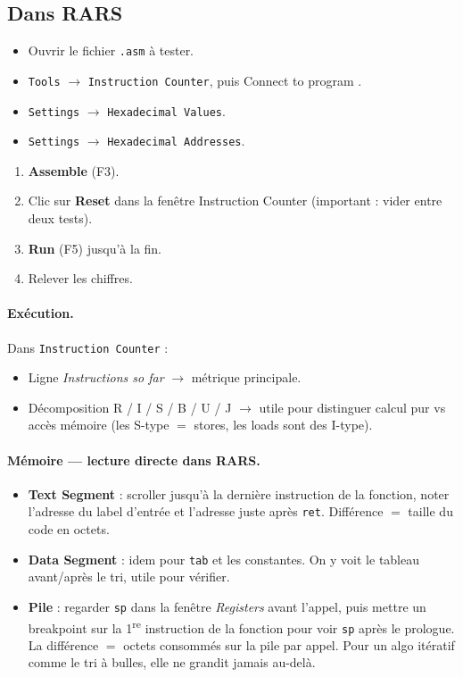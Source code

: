 \documentclass[11pt,a4paper]{article}
\begin{document}
\subsection{Dans RARS}

\begin{itemize}
    \item Ouvrir le fichier \texttt{.asm} à tester.
    \item \texttt{Tools} $\rightarrow$ \texttt{Instruction Counter}, puis \guillemotleft{} Connect to program \guillemotright{}.
    \item \texttt{Settings} $\rightarrow$ \texttt{Hexadecimal Values}.
    \item \texttt{Settings} $\rightarrow$ \texttt{Hexadecimal Addresses}.
\end{itemize}

\begin{enumerate}
    \item \textbf{Assemble} (F3).
    \item Clic sur \textbf{Reset} dans la fenêtre Instruction Counter (important : vider entre deux tests).
    \item \textbf{Run} (F5) jusqu'à la fin.
    \item Relever les chiffres.
\end{enumerate}

\paragraph{Exécution.} Dans \texttt{Instruction Counter} :
\begin{itemize}
    \item Ligne \emph{Instructions so far} $\rightarrow$ métrique principale.
    \item Décomposition R / I / S / B / U / J $\rightarrow$ utile pour distinguer calcul pur vs accès mémoire (les S-type $=$ stores, les loads sont des I-type).
\end{itemize}

\paragraph{Mémoire --- lecture directe dans RARS.}
\begin{itemize}
    \item \textbf{Text Segment} : scroller jusqu'à la dernière instruction de la fonction, noter l'adresse du label d'entrée et l'adresse juste après \texttt{ret}. Différence $=$ taille du code en octets.
    \item \textbf{Data Segment} : idem pour \texttt{tab} et les constantes. On y voit le tableau avant/après le tri, utile pour vérifier.
    \item \textbf{Pile} : regarder \texttt{sp} dans la fenêtre \emph{Registers} avant l'appel, puis mettre un breakpoint sur la 1\textsuperscript{re} instruction de la fonction pour voir \texttt{sp} après le prologue. La différence $=$ octets consommés sur la pile par appel. Pour un algo itératif comme le tri à bulles, elle ne grandit jamais au-delà.
\end{itemize}
\end{document}
